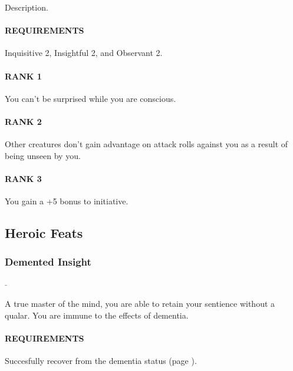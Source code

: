 \normalsize
Description.
\paragraph{REQUIREMENTS} Inquisitive 2, Insightful 2, and Observant 2.
\paragraph{RANK 1} You can't be surprised while you are conscious.
\paragraph{RANK 2} Other creatures don't gain advantage on attack rolls against you as a result of being unseen by you.
\paragraph{RANK 3} You gain a +5 bonus to initiative.

\subsection*{Heroic Feats}
\subsubsection{Demented Insight} \label{feat::dementedinsight}
\small{\textcolor{gray}{-}}

\normalsize
A true master of the mind, you are able to retain your sentience without a qualar.
You are immune to the effects of dementia.
\paragraph{REQUIREMENTS} Succesfully recover from the dementia status (page \pageref{ssec::dementia}).
